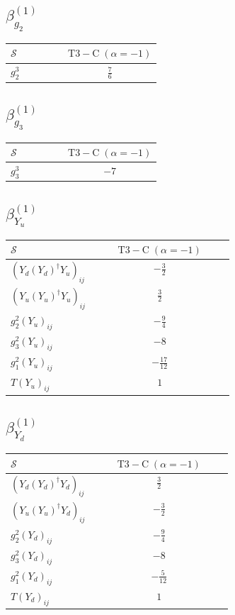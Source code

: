 \documentclass[9pt]{article}
\begin{document}
\subsection*{$ \beta_{g_2}^{(1)} $}
\begin{longtable}{@{}p{0.38\linewidth}c@{}}
\toprule
$\mathcal{S}$ & $ \mathrm{T3-C}\;(\alpha=-1) $ \\
\midrule
$ g_2^3 $ & $ \frac{7}{6} $ \\
\bottomrule
\end{longtable}
\subsection*{$ \beta_{g_3}^{(1)} $}
\begin{longtable}{@{}p{0.38\linewidth}c@{}}
\toprule
$\mathcal{S}$ & $ \mathrm{T3-C}\;(\alpha=-1) $ \\
\midrule
$ g_3^3 $ & $ -7 $ \\
\bottomrule
\end{longtable}
\subsection*{$ \beta_{Y_u}^{(1)} $}
\begin{longtable}{@{}p{0.38\linewidth}c@{}}
\toprule
$\mathcal{S}$ & $ \mathrm{T3-C}\;(\alpha=-1) $ \\
\midrule
$ (Y_d (Y_d)^{\dagger} Y_u)_{ij} $ & $ - \frac{3}{2} $ \\
$ (Y_u (Y_u)^{\dagger} Y_u)_{ij} $ & $ \frac{3}{2} $ \\
$ g_2^2 (Y_u)_{ij} $ & $ - \frac{9}{4} $ \\
$ g_3^2 (Y_u)_{ij} $ & $ -8 $ \\
$ g_1^2 (Y_u)_{ij} $ & $ - \frac{17}{12} $ \\
$ T (Y_u)_{ij} $ & $ 1 $ \\
\bottomrule
\end{longtable}
\subsection*{$ \beta_{Y_d}^{(1)} $}
\begin{longtable}{@{}p{0.38\linewidth}c@{}}
\toprule
$\mathcal{S}$ & $ \mathrm{T3-C}\;(\alpha=-1) $ \\
\midrule
$ (Y_d (Y_d)^{\dagger} Y_d)_{ij} $ & $ \frac{3}{2} $ \\
$ (Y_u (Y_u)^{\dagger} Y_d)_{ij} $ & $ - \frac{3}{2} $ \\
$ g_2^2 (Y_d)_{ij} $ & $ - \frac{9}{4} $ \\
$ g_3^2 (Y_d)_{ij} $ & $ -8 $ \\
$ g_1^2 (Y_d)_{ij} $ & $ - \frac{5}{12} $ \\
$ T (Y_d)_{ij} $ & $ 1 $ \\
\bottomrule
\end{longtable}
\end{document}
